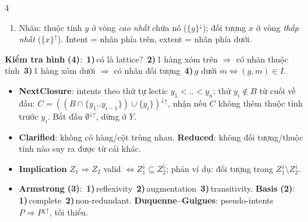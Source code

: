 \documentclass[10pt]{article}
\newcommand{\kw}[1]{\textbf{#1}}
\newcommand{\cnt}[1]{{\color{h2}\bfseries(#1)}}
\newcommand{\n}[1]{\,{\color{h2}\bfseries#1)}\,}
\newcommand{\up}{^{\uparrow}}
\newcommand{\dn}{^{\downarrow}}
\begin{document}
\begin{multicols*}{4}
\begin{enumerate}[leftmargin=8pt]
\item Nhãn: thuộc tính $y$ ở vòng \emph{cao nhất} chứa nó ($\{y\}\dn$); đối tượng $x$ ở vòng \emph{thấp nhất} ($\{x\}\up$). Intent = nhãn phía trên, extent = nhãn phía dưới.
\end{enumerate}
\par\textbf{Kiểm tra hình} \cnt{4}: \n1có là lattice? \n21 hàng xóm trên $\Rightarrow$ có nhãn thuộc tính \n31 hàng xóm dưới $\Rightarrow$ có nhãn đối tượng \n4$g$ dưới $m\iff(g,m)\in I$.
\begin{itemize}
\item \kw{NextClosure}: intents theo thứ tự lectic $y_1<..<y_n$; thử $y_i\notin B$ từ cuối về đầu: $C=((B\cap\{y_1..y_{i-1}\})\cup\{y_i\})\dn{}\up$, nhận nếu $C$ không thêm thuộc tính trước $y_i$. Bắt đầu $\emptyset\dn{}\up$, dừng ở $Y$.
\item \kw{Clarified}: không có hàng/cột trùng nhau. \kw{Reduced}: không đối tượng/thuộc tính nào suy ra được từ cái khác.
\item \kw{Implication} $Z_1\Rightarrow Z_2$ valid $\iff Z_1\dn\subseteq Z_2\dn$; phản ví dụ: đối tượng trong $Z_1\dn\setminus Z_2\dn$.
\item \kw{Armstrong} \cnt{3}: \n1reflexivity \n2augmentation \n3transitivity. \kw{Basis} \cnt{2}: \n1complete \n2non-redundant. \kw{Duquenne--Guigues}: pseudo-intents $P\Rightarrow P\dn{}\up$, tối thiểu.
\end{itemize}


\end{multicols*}
\end{document}
